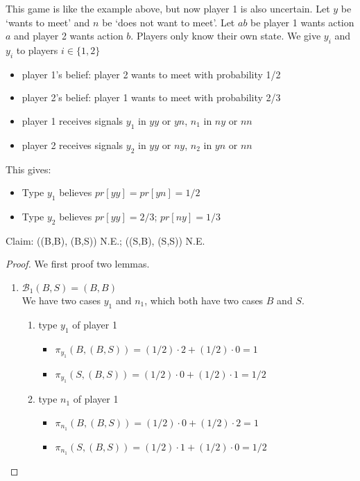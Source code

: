\begin{example}
      This game is like the example above, but now player 1 is also uncertain.
      Let $y$ be `wants to meet' and $n$ be `does not want to meet'.
      Let $ab$ be player 1 wants action $a$ and player 2 wants action $b$.
      Players only know their own state. We give $y_i$ and $y_i$ to players $i \in \{1,2\}$

      \begin{itemize}
            \item player 1's belief: player 2 wants to meet with probability 1/2
            \item player 2's belief: player 1 wants to meet with probability 2/3
            \item player 1 receives signals $y_1$ in $yy$ or $yn$, $n_1$ in $ny$ or $nn$
            \item player 2 receives signals $y_2$ in $yy$ or $ny$, $n_2$ in $yn$ or $nn$
      \end{itemize}
      This gives:
      \begin{itemize}
            \item Type $y_1$ believes $pr[yy]=pr[yn]=1/2$
            \item Type $y_2$ believes $pr[yy]=2/3$; $pr[ny]=1/3$
      \end{itemize}
      Claim: ((B,B), (B,S)) N.E.; ((S,B), (S,S)) N.E.
      \begin{proof}
            We first proof two lemmas.
            \begin{enumerate}[label=Lemma \arabic*.]
                  \item $\mathcal B_1 (B,S) = (B,B)$\\
                        We have two cases $y_1$ and $n_1$, which both have two cases $B$ and $S$.
                        \begin{enumerate}[label=(\roman*)]
                              \item type $y_1$ of player 1
                                    \begin{itemize}
                                          \item $\pi_{y_1} (B,(B,S)) = (1/2)\cdot 2+(1/2)\cdot 0 = 1$
                                          \item $\pi_{y_1} (S,(B,S)) = (1/2)\cdot 0+(1/2)\cdot 1 = 1/2$
                                    \end{itemize}
                              \item type $n_1$ of player 1
                                    \begin{itemize}
                                          \item $\pi_{n_1} (B,(B,S)) = (1/2)\cdot 0+(1/2)\cdot 2 = 1$
                                          \item $\pi_{n_1} (S,(B,S)) = (1/2)\cdot 1+(1/2)\cdot 0 = 1/2$
                                    \end{itemize}
                        \end{enumerate}


\end{enumerate}
\end{proof}
\end{example}

